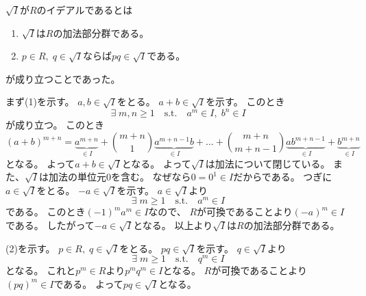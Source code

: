 \documentclass[report]{jlreq}
\begin{document}
\begin{answer}
    $\sqrt{I}$が$R$のイデアルであるとは
    \begin{enumerate}
        \item $\sqrt{I}$は$R$の加法部分群である。
        \item $p \in R, \; q \in \sqrt{I}$ならば$pq \in \sqrt{I}$である。
    \end{enumerate}
    が成り立つことであった。

    まず(1)を示す。
    $a, b \in \sqrt{I}$をとる。
    $a + b \in \sqrt{I}$を示す。
    このとき
    \begin{equation}
        \exists \; m, n \ge 1
        \quad \text{s.t.} \quad
        a^m \in I, \; b^n \in I
    \end{equation}
    が成り立つ。
    このとき
    \begin{equation}
        (a + b)^{m + n}
            = \underbrace{a^{m + n}}_{\in I}
            + \binom{m + n}{1} \underbrace{a^{m + n - 1} b}_{\in I}
            + \dots
            + \binom{m + n}{m + n - 1} \underbrace{a b^{m + n - 1}}_{\in I}
            + \underbrace{b^{m + n}}_{\in I}
    \end{equation}
    となる。
    よって$a + b \in \sqrt{I}$となる。
    よって$\sqrt{I}$は加法について閉じている。
    また、$\sqrt{I}$は加法の単位元$0$を含む。
    なぜなら$0 = 0^1 \in I$だからである。
    つぎに$a \in \sqrt{I}$をとる。
    $-a \in \sqrt{I}$を示す。
    $a \in \sqrt{I}$より
    \begin{equation}
        \exists \; m \ge 1
        \quad \text{s.t.} \quad
        a^m \in I
    \end{equation}
    である。
    このとき$(-1)^m a^m \in I$なので、
    $R$が可換であることより$(-a)^m \in I$である。
    したがって$-a \in \sqrt{I}$となる。
    以上より$\sqrt{I}$は$R$の加法部分群である。

    (2)を示す。
    $p \in R, \; q \in \sqrt{I}$をとる。
    $pq \in \sqrt{I}$を示す。
    $q \in \sqrt{I}$より
    \begin{equation}
        \exists \; m \ge 1
        \quad \text{s.t.} \quad
        q^m \in I
    \end{equation}
    となる。
    これと$p^m \in R$より$p^m q^m \in I$となる。
    $R$が可換であることより$(pq)^m \in I$である。
    よって$pq \in \sqrt{I}$となる。
\end{answer}


\end{document}
